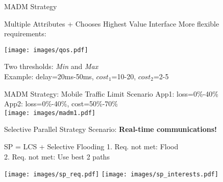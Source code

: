 
\begin{frame}{MADM Strategy}
	\vspace*{-1em}
		\begin{block}{Multiple Attributes + Chooses Highest Value Interface}
				More flexible requirements:\\
				\begin{center}
					\texttt{[image: images/qos.pdf]}
				\end{center}
			
		\end{block}
		Two thresholds: \emph{Min} and \emph{Max}\\
		Example: delay=20ms-50ms, $cost_1$=10-20, $cost_2$=2-5\\
		
	
\end{frame}

\begin{frame}{MADM Strategy: Mobile Traffic Limit Scenario}
	\vspace*{-1.5em}
	App1: loss=0\%-40\% \\
	App2: loss=0\%-40\%, cost=50\%-70\% 
	\begin{equation}
	\end{equation}
	\texttt{[image: images/madm1.pdf]}
\end{frame}

\begin{frame}{Selective Parallel Strategy}
	\vspace*{-1.5em}
	Scenario: \textbf{Real-time communications!}
	\vspace*{.5em}
	\begin{block}{SP = LCS + Selective Flooding}
			1. Req. not met: Flood\\
			2. Req. not met: Use best 2 paths
	\end{block}
	\vspace*{.4em}
	\texttt{[image: images/sp\_req.pdf]}
	\texttt{[image: images/sp\_interests.pdf]}
	
\end{frame}

